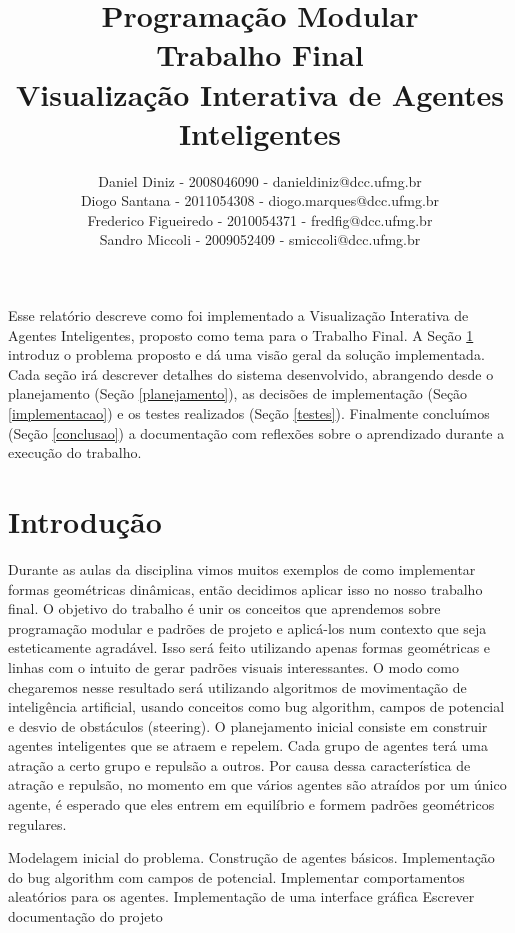 \documentclass[12pt]{article}
\title{Programação Modular \\ Trabalho Final \\ Visualização Interativa de Agentes Inteligentes}
\author{Daniel Diniz - 2008046090 - danieldiniz@dcc.ufmg.br\\
		Diogo Santana - 2011054308 - diogo.marques@dcc.ufmg.br\\
		Frederico Figueiredo - 2010054371 - fredfig@dcc.ufmg.br\\
		Sandro Miccoli - 2009052409 - smiccoli@dcc.ufmg.br}
\begin{document}
\maketitle


\begin{resumo}

Esse relatório descreve como foi implementado a Visualização Interativa de Agentes Inteligentes, proposto como tema para o Trabalho Final. A Seção \ref{introducao} introduz o problema proposto e dá uma visão geral da solução implementada. Cada seção irá descrever detalhes do sistema desenvolvido, abrangendo desde o planejamento (Seção \ref{planejamento}), as decisões de implementação (Seção \ref{implementacao}) e os testes realizados (Seção \ref{testes}). Finalmente concluímos (Seção \ref{conclusao}) a documentação com reflexões sobre o aprendizado durante a execução do trabalho.

\end{resumo}

\section{Introdução}
\label{introducao}

Durante as aulas da disciplina vimos muitos exemplos de como implementar formas geométricas dinâmicas, então decidimos aplicar isso no nosso trabalho final. O objetivo do trabalho é unir os conceitos que aprendemos sobre programação modular e padrões de projeto e aplicá-los num contexto que seja esteticamente agradável. Isso será feito utilizando apenas formas geométricas e linhas com o intuito de gerar padrões visuais interessantes.
O modo como chegaremos nesse resultado será utilizando algoritmos de movimentação de inteligência artificial, usando conceitos como bug algorithm, campos de potencial e desvio de obstáculos (steering).
O planejamento inicial consiste em construir agentes inteligentes que se atraem e repelem. Cada grupo de agentes terá uma atração a certo grupo e repulsão a outros. Por causa dessa característica de atração e repulsão, no momento em que vários agentes são atraídos por um único agente, é esperado que eles entrem em equilíbrio e formem padrões geométricos regulares.

Modelagem inicial do problema.
Construção de agentes básicos.
Implementação do bug algorithm com campos de potencial.
Implementar comportamentos aleatórios para os agentes.
Implementação de uma interface gráfica
Escrever documentação do projeto
\end{document}
